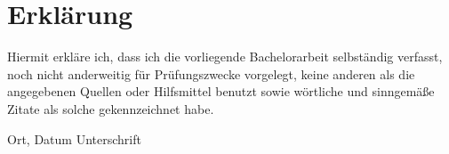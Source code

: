 
\chapter*{Erklärung}
Hiermit erkläre ich, dass ich die vorliegende Bachelorarbeit selbständig verfasst, noch nicht anderweitig für Prüfungszwecke vorgelegt, keine anderen als die angegebenen Quellen oder Hilfsmittel benutzt sowie wörtliche und sinngemäße Zitate als solche gekennzeichnet habe.
\vspace{3cm}

Ort, Datum \hspace{5cm} Unterschrift